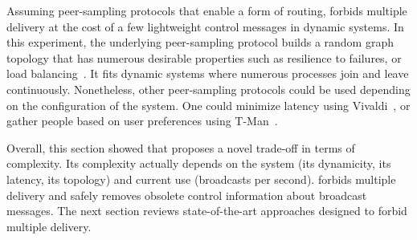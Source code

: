 \noindent Assuming peer-sampling protocols that enable a form of routing,
\RPCBROADCAST forbids multiple delivery at the cost of a few lightweight control
messages in dynamic systems. In this experiment, the underlying peer-sampling
protocol builds a random graph topology that has numerous desirable properties
such as resilience to failures, or load balancing~\cite{jelasity2007gossip}. It
fits dynamic systems where numerous processes join and leave
continuously. Nonetheless, other peer-sampling protocols could be used depending
on the configuration of the system. One could minimize latency using
Vivaldi~\cite{dabek2004vivaldi}, or gather people based on user preferences
using T-Man~\cite{jelasity2009tman}.




Overall, this section showed that \RPCBROADCAST proposes a novel trade-off in
terms of complexity. Its complexity actually depends on the system (its
dynamicity, its latency, its topology) and current use (broadcasts per second).
\RPCBROADCAST forbids multiple delivery and safely removes obsolete control
information about broadcast messages. The next section reviews state-of-the-art
approaches designed to forbid multiple delivery.




